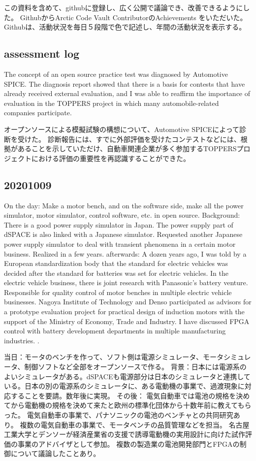 \documentclass[twocolumn]{article} %
\begin{document}
この資料を含めて、githubに登録し、広く公開で議論でき、改善できるようにした。
GithubからArctic Code Vault ContributorのAchievements をいただいた\cite{githubachieve}。
Githubは、活動状況を毎日５段階で色で記述し、年間の活動状況を表示する。\cite{gap2021}


\subsection{assessment log}
The concept of an open source practice test was diagnosed by Automotive SPICE.
The diagnosis report showed that there is a basis for contests that have already received external evaluation, and I was able to reaffirm the importance of evaluation in the TOPPERS project in which many automobile-related companies participate.

オープンソースによる模擬試験の構想について、Automotive SPICEによって診断を受けた。
診断報告には、すでに外部評価を受けたコンテストなどには、根拠があることを示していただけ、自動車関連企業が多く参加するTOPPERSプロジェクトにおける評価の重要性を再認識することができた。

\subsection{20201009}

On the day: Make a motor bench, and on the software side, make all the power simulator, motor simulator, control software, etc. in open source.
Background: There is a good power supply simulator in Japan. The power supply part of dSPACE is also linked with a Japanese simulator. Requested another Japanese power supply simulator to deal with transient phenomena in a certain motor business. Realized in a few years.
afterwards:
A dozen years ago, I was told by a European standardization body that the standard for electric vehicles was decided after the standard for batteries was set for electric vehicles.
In the electric vehicle business, there is joint research with Panasonic's battery venture.
Responsible for quality control of motor benches in multiple electric vehicle businesses.
Nagoya Institute of Technology and Denso participated as advisors for a prototype evaluation project for practical design of induction motors with the support of the Ministry of Economy, Trade and Industry.
I have discussed FPGA control with battery development departments in multiple manufacturing industries. \cite{starc}.

当日：モータのベンチを作って、ソフト側は電源シミュレータ、モータシミュレータ、制御ソフトなど全部をオープンソースで作る。
背景：日本には電源系のよいシミュレータがある。dSPACEも電源部分は日本のシミュレータと連携している。日本の別の電源系のシミュレータに、ある電動機の事業で、過渡現象に対応することを要請。数年後に実現。
その後：
電気自動車では電池の規格を決めてから電動機の規格を決めて来たと欧州の標準化団体から十数年前に教えてもらった。
電気自動車の事業で、パナソニックの電池のベンチャとの共同研究あり。
複数の電気自動車の事業で、モータベンチの品質管理などを担当。
名古屋工業大学とデンソーが経済産業省の支援で誘導電動機の実用設計に向けた試作評価の事業のアドバイザとして参加。
複数の製造業の電池開発部門とFPGAの制御について議論したことあり\cite{starc}。
\end{document}
